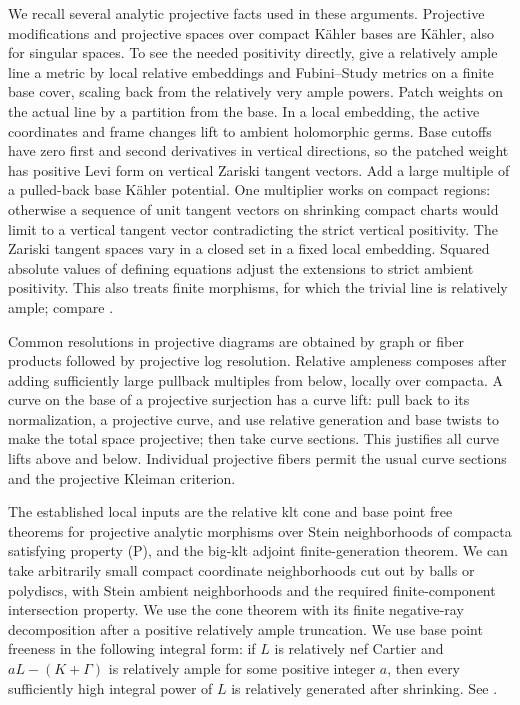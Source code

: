 We recall several analytic projective facts used in these arguments.
Projective modifications and projective spaces over compact K\"ahler
bases are K\"ahler, also for singular spaces.  To see the needed
positivity directly, give a relatively ample line a metric by local
relative embeddings and Fubini--Study metrics on a finite base cover,
scaling back from the relatively very ample powers.  Patch weights on
the actual line by a partition from the base.  In a local embedding,
the active coordinates and frame changes lift to ambient holomorphic
germs.  Base cutoffs have zero first and second derivatives in
vertical directions, so the patched weight has positive Levi form on
vertical Zariski tangent vectors.  Add a large multiple of a pulled-back
base K\"ahler potential.  One multiplier works on compact regions:
otherwise a sequence of unit tangent vectors on shrinking compact
charts would limit to a vertical tangent vector contradicting the
strict vertical positivity.  The Zariski tangent spaces vary in a
closed set in a fixed local embedding.  Squared absolute values of
defining equations adjust the extensions to strict ambient
positivity.  This also treats finite morphisms, for which the trivial
line is relatively ample; compare \cite{VarouchasKahler}.

Common resolutions in projective diagrams are obtained by graph or
fiber products followed by projective log resolution.  Relative
ampleness composes after adding sufficiently large pullback multiples
from below, locally over compacta.  A curve on the base of a
projective surjection has a curve lift: pull back to its normalization,
a projective curve, and use relative generation and base twists to
make the total space projective; then take curve sections.  This
justifies all curve lifts above and below.  Individual projective
fibers permit the usual curve sections and the projective Kleiman
criterion.

The established local inputs are the relative klt cone and base point
free theorems for projective analytic morphisms over Stein
neighborhoods of compacta satisfying property (P), and the big-klt
adjoint finite-generation theorem.  We can take arbitrarily small
compact coordinate neighborhoods cut out by balls or polydiscs, with
Stein ambient neighborhoods and the required finite-component
intersection property.  We use the cone theorem with its finite
negative-ray decomposition after a positive relatively ample
truncation.  We use base point freeness in the following integral
form: if $L$ is relatively nef Cartier and
$aL-(K+\Gamma)$ is relatively ample for some positive integer $a$,
then every sufficiently high integral power of $L$ is relatively
generated after shrinking.  See
\cite[Theorems~6.2, 6.5, and 7.2]{FujinoAnalyticMMP}.


